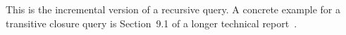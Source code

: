 \noindent This is the incremental version of a recursive query.  A
concrete example for a transitive closure query is Section~9.1 of
a longer technical report~\cite{tr}.


%
%
%
%
%
